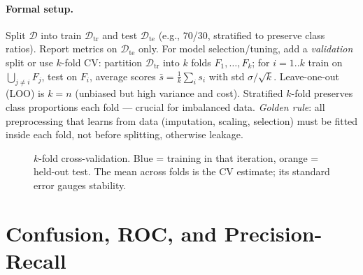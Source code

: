 \paragraph{Formal setup.} Split $\mathcal{D}$ into train $\mathcal{D}_{\text{tr}}$ and test $\mathcal{D}_{\text{te}}$ (e.g., 70/30, stratified to preserve class ratios). Report metrics on $\mathcal{D}_{\text{te}}$ only. For model selection/tuning, add a \emph{validation} split or use $k$-fold CV: partition $\mathcal{D}_{\text{tr}}$ into $k$ folds $F_1,\dots,F_k$; for $i=1..k$ train on $\bigcup_{j\neq i}F_j$, test on $F_i$, average scores $\bar{s}=\frac1k\sum_i s_i$ with std $\sigma/\sqrt{k}$. Leave-one-out (LOO) is $k=n$ (unbiased but high variance and cost). Stratified $k$-fold preserves class proportions each fold --- crucial for imbalanced data. \emph{Golden rule}: all preprocessing that learns from data (imputation, scaling, selection) must be fitted inside each fold, not before splitting, otherwise leakage.

\begin{figure}[h]\centering
{}
\caption{$k$-fold cross-validation. Blue = training in that iteration, orange = held-out test. The mean across folds is the CV estimate; its standard error gauges stability.}
\label{fig:kfold}
\end{figure}

\section{Confusion, ROC, and Precision-Recall}
\label{sec:roc}

